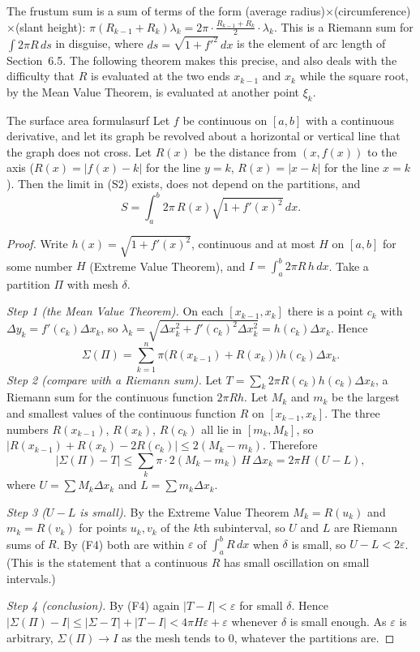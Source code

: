\documentclass[11pt]{article}
\begin{document}
The frustum sum is a sum of terms of the form (average radius)$\times$(circumference)$\times$(slant height): $\pi(R_{k-1}+R_k)\lambda_k=2\pi\cdot\frac{R_{k-1}+R_k}2\cdot\lambda_k$. This is a Riemann sum for $\int2\pi R\,ds$ in disguise, where $ds=\sqrt{1+f'^2}\,dx$ is the element of arc length of Section~6.5. The following theorem makes this precise, and also deals with the difficulty that $R$ is evaluated at the two ends $x_{k-1}$ and $x_k$ while the square root, by the Mean Value Theorem, is evaluated at another point $\xi_k$.

\begin{thm}{The surface area formula}{surf}
Let $f$ be continuous on $[a,b]$ with a continuous derivative, and let its graph be revolved about a horizontal or vertical line that the graph does not cross. Let $R(x)$ be the distance from $(x,f(x))$ to the axis ($R(x)=\lvert f(x)-k\rvert$ for the line $y=k$, $R(x)=\lvert x-k\rvert$ for the line $x=k$). Then the limit in (S2) exists, does not depend on the partitions, and
\[
S=\int_a^b2\pi\,R(x)\sqrt{1+f'(x)^2}\,dx .
\]
\end{thm}
\begin{proof}
Write $h(x)=\sqrt{1+f'(x)^2}$, continuous and at most $H$ on $[a,b]$ for some number $H$ (Extreme Value Theorem), and $I=\int_a^b2\pi R\,h\,dx$. Take a partition $\Pi$ with mesh $\delta$.

\emph{Step 1 (the Mean Value Theorem).} On each $[x_{k-1},x_k]$ there is a point $c_k$ with $\Delta y_k=f'(c_k)\Delta x_k$, so $\lambda_k=\sqrt{\Delta x_k^2+f'(c_k)^2\Delta x_k^2}=h(c_k)\Delta x_k$. Hence
\[
\Sigma(\Pi)=\sum_{k=1}^n\pi\bigl(R(x_{k-1})+R(x_k)\bigr)h(c_k)\Delta x_k .
\]
\emph{Step 2 (compare with a Riemann sum).} Let $T=\sum_k2\pi R(c_k)h(c_k)\Delta x_k$, a Riemann sum for the continuous function $2\pi Rh$. Let $M_k$ and $m_k$ be the largest and smallest values of the continuous function $R$ on $[x_{k-1},x_k]$. The three numbers $R(x_{k-1})$, $R(x_k)$, $R(c_k)$ all lie in $[m_k,M_k]$, so $\lvert R(x_{k-1})+R(x_k)-2R(c_k)\rvert\le2(M_k-m_k)$. Therefore
\[
\lvert\Sigma(\Pi)-T\rvert\le\sum_k\pi\cdot2(M_k-m_k)\,H\,\Delta x_k=2\pi H\,(U-L),
\]
where $U=\sum M_k\Delta x_k$ and $L=\sum m_k\Delta x_k$.

\emph{Step 3 ($U-L$ is small).} By the Extreme Value Theorem $M_k=R(u_k)$ and $m_k=R(v_k)$ for points $u_k,v_k$ of the $k$th subinterval, so $U$ and $L$ are Riemann sums of $R$. By (F4) both are within $\varepsilon$ of $\int_a^bR\,dx$ when $\delta$ is small, so $U-L<2\varepsilon$. (This is the statement that a continuous $R$ has small oscillation on small intervals.)

\emph{Step 4 (conclusion).} By (F4) again $\lvert T-I\rvert<\varepsilon$ for small $\delta$. Hence $\lvert\Sigma(\Pi)-I\rvert\le\lvert\Sigma-T\rvert+\lvert T-I\rvert<4\pi H\varepsilon+\varepsilon$ whenever $\delta$ is small enough. As $\varepsilon$ is arbitrary, $\Sigma(\Pi)\to I$ as the mesh tends to $0$, whatever the partitions are.
\end{proof}
\end{document}
